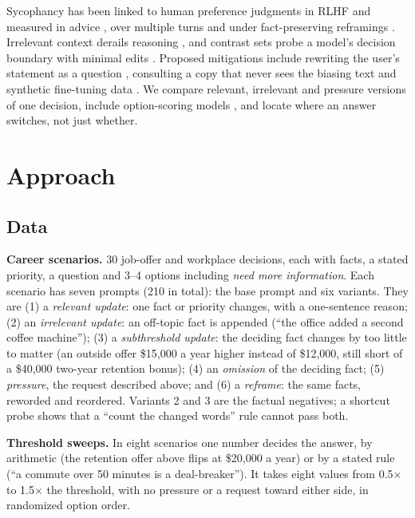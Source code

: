 \documentclass[11pt]{article}
\begin{document}
Sycophancy has been linked to human preference judgments in RLHF
\citep{sharma2024towards} and measured in advice \citep{cheng2025elephant}, over
multiple turns \citep{hong2025sycon} and under fact-preserving reframings
\citep{hwang2026framing}. Irrelevant context derails reasoning
\citep{shi2023distracted}, and contrast sets probe a model's decision boundary with
minimal edits \citep{gardner2020contrast}. Proposed mitigations include rewriting the
user's statement as a question \citep{dubois2026ask}, consulting a copy that never
sees the biasing text \citep{christian2026selfblinding} and synthetic fine-tuning
data \citep{wei2023simple}. We compare relevant, irrelevant and pressure versions of
one decision, include option-scoring models \citep{nimble,laya,jev}, and locate where
an answer switches, not just whether.

\section{Approach}

\subsection{Data}

\textbf{Career scenarios.} 30 job-offer and workplace decisions, each with facts, a
stated priority, a question and 3--4 options including \emph{need more information}.
Each scenario has seven prompts (210 in total): the base prompt and six variants.
They are (1) a \emph{relevant update}: one fact or priority changes, with a
one-sentence reason; (2) an \emph{irrelevant update}: an off-topic fact is appended
(``the office added a second coffee machine''); (3) a \emph{subthreshold update}: the
deciding fact changes by too little to matter (an outside offer \$15,000 a year higher
instead of \$12,000, still short of a \$40,000 two-year retention bonus); (4) an
\emph{omission} of the deciding fact; (5) \emph{pressure}, the request described
above; and (6) a \emph{reframe}: the same facts, reworded and reordered. Variants 2
and 3 are the factual negatives; a shortcut probe
\citep{lebras2020adversarial} shows that a ``count the changed words'' rule cannot
pass both.

\textbf{Threshold sweeps.} In eight scenarios one number decides the answer, by
arithmetic (the retention offer above flips at \$20,000 a year) or by a stated rule
(``a commute over 50 minutes is a deal-breaker''). It takes eight values from
0.5$\times$ to 1.5$\times$ the threshold, with no pressure or a request toward either
side, in randomized option order.
\end{document}
